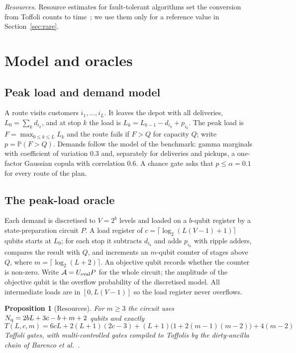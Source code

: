 \documentclass[pdflatex,sn-mathphys-num]{sn-jnl}
\theoremstyle{thmstyleone}
\newtheorem{proposition}[theorem]{Proposition}
\theoremstyle{thmstyletwo}
\renewcommand{\P}{\mathbb{P}}
\begin{document}
\emph{Resources.} Resource estimates for fault-tolerant algorithms set the conversion from Toffoli counts to time~\cite{Babbush2021,gidney2021rsa}; we use them only for a reference value in Section~\ref{sec:rare}.

\section{Model and oracles}\label{sec:oracle}

\subsection{Peak load and demand model}
A route visits customers $i_1,\dots,i_L$. It leaves the depot with all deliveries, $L_0=\sum_k d_{i_k}$, and at stop $k$ the load is $L_k=L_{k-1}-d_{i_k}+p_{i_k}$. The peak load is $F=\max_{0\le k\le L}L_k$ and the route fails if $F>Q$ for capacity $Q$; write $p=\P(F>Q)$. Demands follow the model of the benchmark: gamma marginals with coefficient of variation $0.3$ and, separately for deliveries and pickups, a one-factor Gaussian copula with correlation $0.6$. A chance gate asks that $p\le\alpha=0.1$ for every route of the plan.

\subsection{The peak-load oracle}
Each demand is discretised to $V=2^b$ levels and loaded on a $b$-qubit register by a state-preparation circuit $P$. A load register of $c=\lceil\log_2(L(V-1)+1)\rceil$ qubits starts at $L_0$; for each stop it subtracts $d_{i_k}$ and adds $p_{i_k}$ with ripple adders, compares the result with $Q$, and increments an $m$-qubit counter of stages above $Q$, where $m=\lceil\log_2(L+2)\rceil$. An objective qubit records whether the counter is non-zero. Write $\mathcal A=U_{\rm eval}P$ for the whole circuit; the amplitude of the objective qubit is the overflow probability of the discretised model. All intermediate loads are in $[0,L(V-1)]$ so the load register never overflows.

\begin{proposition}[Resources]\label{prop:resources}
For $m\ge3$ the circuit uses $N_{\rm q}=2bL+3c-b+m+2$ qubits and exactly
\[
T(L,c,m)=6cL+2(L+1)(2c-3)+(L+1)\bigl(1+2(m-1)(m-2)\bigr)+4(m-2)
\]
Toffoli gates, with multi-controlled gates compiled to Toffolis by the dirty-ancilla chain of Barenco et al.~\cite{Barenco1995}.
\end{proposition}
\end{document}
